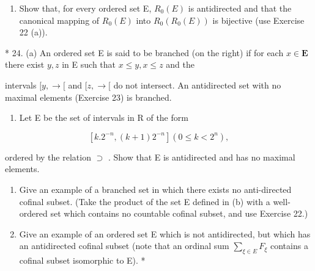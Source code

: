 \begin{enumerate}
\def\labelenumi{(\alph{enumi})}
\setcounter{enumi}{2}
\tightlist
\item
  Show that, for every ordered set E, \(R_{0}(E)\) is antidirected and that the canonical mapping of \(R_{0}(E)\) into \(R_{0}(R_{0}(E))\) is bijective (use Exercise 22 (a)).
\end{enumerate}

* 24. (a) An ordered set E is said to be branched (on the right) if for each \(x \in \mathbf{E}\) there exist \(y, z\) in E such that \(x \leqslant y, x \leqslant z\) and the

intervals \([y, \rightarrow[\) and \([z, \rightarrow[\) do not intersect. An antidirected set with no maximal elements (Exercise 23) is branched.

\begin{enumerate}
\def\labelenumi{(\alph{enumi})}
\setcounter{enumi}{1}
\tightlist
\item
  Let E be the set of intervals in R of the form
\end{enumerate}

\[
[ k. 2 ^ {- n}, (k + 1) 2 ^ {- n} ] (0 \leqslant k <   2 ^ {n}),
\]

ordered by the relation \(\supset\) . Show that E is antidirected and has no maximal elements.

\begin{enumerate}
\def\labelenumi{(\alph{enumi})}
\setcounter{enumi}{2}
\item
  Give an example of a branched set in which there exists no anti-directed cofinal subset. (Take the product of the set E defined in (b) with a well-ordered set which contains no countable cofinal subset, and use Exercise 22.)
\item
  Give an example of an ordered set E which is not antidirected, but which has an antidirected cofinal subset (note that an ordinal sum \(\sum_{\xi\in E} F_{\xi}\) contains a cofinal subset isomorphic to E). *
\end{enumerate}

